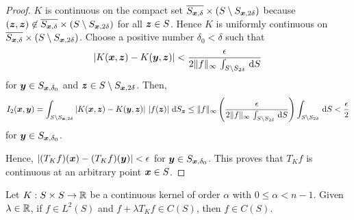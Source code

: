 \begin{proof}
$K$ is continuous on the compact set
$\overline{S_{{\bm{x}},\delta}} \times (S\setminus S_{{\bm{x}},2\delta})$ because
$({\bm{z}},{\bm{z}}) \not\in \overline{S_{{\bm{x}},\delta}}
\times (S\setminus S_{{\bm{x}},2\delta})$
for all ${\bm{z}}\in S$.  Hence $K$ is uniformly continuous on
$\overline{S_{{\bm{x}},\delta}} \times (S\setminus S_{{\bm{x}},2\delta})$.
Choose a positive number $\delta_0 < \delta$ such that
\[
|K({\bm{x}},{\bm{z}}) - K({\bm{y}},{\bm{z}})| <
\frac{\epsilon}{2 \|f\|_\infty \,\int_{S\setminus S_{2\delta}} \,\mathrm{d}{S}}
\]
for ${\bm{y}} \in S_{{\bm{x}},\delta_0}$ and
${\bm{z}} \in S\setminus S_{{\bm{x}},2\delta}$.  Then,
\[
I_2({\bm{x}},{\bm{y}}) = \int_{S\setminus S_{{\bm{x}},2\delta}}
\left| K({\bm{x}},{\bm{z}}) - K({\bm{y}},{\bm{z}})\right|\,
\left| f({\bm{z}}) \right|\,\mathrm{d}{S}_{{\bm{z}}}
\leq \|f\|_{\infty}
\left( \frac{\epsilon}{2 \|f\|_\infty \,\int_{S\setminus S_{2\delta}} \,\mathrm{d}{S}}
\right) \int_{S\setminus S_{2\delta}}  \,\mathrm{d}{S}
< \frac{\epsilon}{2}
\]
for ${\bm{y}} \in S_{{\bm{x}},\delta_0}$.

 Hence,
$\displaystyle \left| (T_K f)({\bm{x}}) - (T_K f)({\bm{y}}) \right| < \epsilon$
for ${\bm{y}} \in S_{{\bm{x}},\delta_0}$.  This proves that $T_K f$ is continuous
at an arbitrary point ${\bm{x}}\in S$.
\end{proof}

\begin{prop} \label{pot_compt_cont_K}
Let $K:S\times S \rightarrow \mathbb{R}$ be a continuous kernel of order
$\alpha$ with $0\leq \alpha < n-1$.  Given $\lambda \in \mathbb{R}$, if
$\displaystyle f \in L^2(S)$ and $f + \lambda T_K f \in C(S)$,
 then $f \in C(S)$.
\end{prop}

